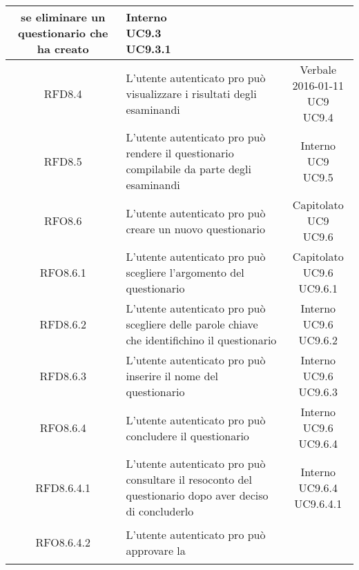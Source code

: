 \begin{longtable}{|c|>{\centering}m{7cm}|c|}
se eliminare un questionario che ha creato & \makecell{Interno\\ UC9.3 \\UC9.3.1 } \\ \hline
			 \hypertarget{{RFD8.4}}{{RFD8.4}} & L’utente autenticato pro può visualizzare
i risultati degli esaminandi & \makecell{Verbale 2016-01-11\\ UC9 \\UC9.4 } \\ \hline
			 \hypertarget{{RFD8.5}}{{RFD8.5}} & L’utente autenticato pro può rendere il
questionario compilabile da parte degli
esaminandi & \makecell{Interno\\ UC9 \\UC9.5 } \\ \hline
			 \hypertarget{{RFO8.6}}{{RFO8.6}} & L’utente autenticato pro può creare un
nuovo questionario & \makecell{Capitolato\\ UC9 \\UC9.6 } \\ \hline
			 \hypertarget{{RFO8.6.1}}{{RFO8.6.1}} & L’utente autenticato pro può scegliere
l’argomento del questionario & \makecell{Capitolato\\ UC9.6 \\UC9.6.1 } \\ \hline
			 \hypertarget{{RFD8.6.2}}{{RFD8.6.2}} & L’utente autenticato pro può scegliere
delle parole chiave che identifichino il
questionario & \makecell{Interno\\ UC9.6 \\UC9.6.2 } \\ \hline
			 \hypertarget{{RFD8.6.3}}{{RFD8.6.3}} & L’utente autenticato pro può inserire il
nome del questionario  & \makecell{Interno\\ UC9.6 \\UC9.6.3 } \\ \hline
			 \hypertarget{{RFO8.6.4}}{{RFO8.6.4}} & L’utente autenticato pro può concludere
il questionario & \makecell{Interno\\ UC9.6 \\UC9.6.4 } \\ \hline
			 \hypertarget{{RFD8.6.4.1}}{{RFD8.6.4.1}} & L’utente autenticato pro può consultare il
resoconto del questionario dopo aver
deciso di concluderlo & \makecell{Interno\\ UC9.6.4 \\UC9.6.4.1 } \\ \hline
			 \hypertarget{{RFO8.6.4.2}}{{RFO8.6.4.2}} & L’utente autenticato pro può approvare la

\end{longtable}
